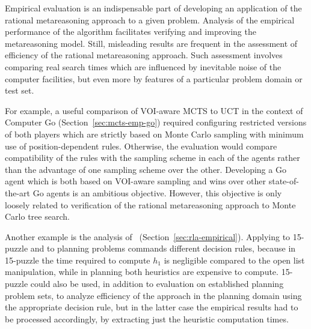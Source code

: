Empirical evaluation is an indispensable part of developing an
application of the rational metareasoning approach to a given
problem. Analysis of the empirical performance of the algorithm
facilitates verifying and improving the metareasoning model.  Still,
misleading results are frequent in the assessment of efficiency of the
rational metareasoning approach. Such assessment involves comparing
real search times which are influenced by inevitable noise of the
computer facilities, but even more by features of a particular problem
domain or test set. 

For example, a useful comparison of VOI-aware MCTS
to UCT in the context of Computer Go (Section~\ref{sec:mcts-emp-go})
required configuring restricted versions of both players which are
strictly based on Monte Carlo sampling with minimum use of
position-dependent rules. Otherwise, the evaluation would compare
compatibility of the rules with the sampling scheme in each of the
agents rather than the advantage of one sampling scheme over the
other. Developing a Go agent which is both based on VOI-aware sampling
and wins over other state-of-the-art Go agents is an ambitious
objective. However, this objective is only loosely related to
verification of the rational metareasoning approach to Monte Carlo
tree search. 

Another example is the analysis of
\rationallazyastar~(Section~\ref{sec:rla-empirical}). Applying
\rationallazyastar to 15-puzzle and to planning problems commands
different decision rules, because in 15-puzzle the time required to
compute $h_1$ is negligible compared to the open list manipulation,
while in planning both heuristics are expensive to compute. 15-puzzle
could also be used, in addition to evaluation on established planning
problem sets, to analyze efficiency of the approach  in the
planning domain using the appropriate decision rule, but in the latter
case the empirical results had to be processed accordingly,
by extracting just the heuristic computation times. 
